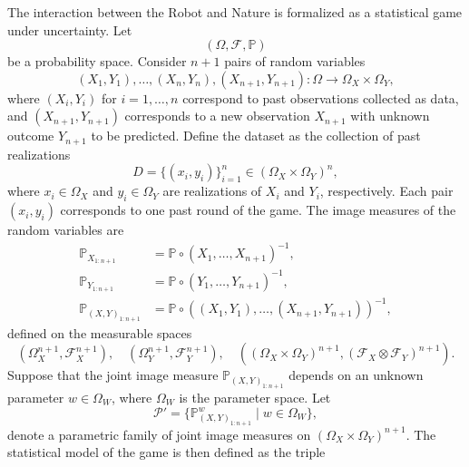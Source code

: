 \begin{definition}
	\label{def:statistical_game}
	The interaction between the Robot and Nature is formalized as a statistical game under uncertainty. Let
	\begin{equation}
		(\Omega, \mathcal{F}, \mathbb{P})
	\end{equation}
	be a probability space. Consider $n+1$ pairs of random variables
	\begin{equation}
		(X_1, Y_1), \dots, (X_n, Y_n), (X_{n+1}, Y_{n+1}) \colon \Omega \to \Omega_X \times \Omega_Y,
	\end{equation}
	where $(X_i,Y_i)$ for $i=1,\dots,n$ correspond to past observations collected as data, and $(X_{n+1},Y_{n+1})$ corresponds to a new observation $X_{n+1}$ with unknown outcome $Y_{n+1}$ to be predicted. Define the dataset as the collection of past realizations
	\begin{equation}
		D = \{(x_i, y_i)\}_{i=1}^n \in (\Omega_X \times \Omega_Y)^n,
	\end{equation}
	where $x_i \in \Omega_X$ and $y_i \in \Omega_Y$ are realizations of $X_i$ and $Y_i$, respectively. Each pair $(x_i, y_i)$ corresponds to one past round of the game. The image measures of the random variables are
	\begin{equation}
		\begin{split}
			\mathbb{P}_{X_{1:n+1}} &= \mathbb{P} \circ (X_1,\dots,X_{n+1})^{-1},\\
			\mathbb{P}_{Y_{1:n+1}} &= \mathbb{P} \circ (Y_1,\dots,Y_{n+1})^{-1},\\
			\mathbb{P}_{(X,Y)_{1:n+1}} &= \mathbb{P} \circ ((X_1,Y_1),\dots,(X_{n+1},Y_{n+1}))^{-1},
		\end{split}
	\end{equation}
	defined on the measurable spaces
	\begin{equation}
		(\Omega_X^{n+1},\mathcal{F}_X^{n+1}), \quad(\Omega_Y^{n+1},\mathcal{F}_Y^{n+1}), \quad ((\Omega_X \times \Omega_Y)^{n+1}, (\mathcal{F}_X \otimes \mathcal{F}_Y)^{n+1}).
	\end{equation}
	Suppose that the joint image measure $\mathbb{P}_{(X,Y)_{1:n+1}}$ depends on an unknown parameter $w \in \Omega_W$, where $\Omega_W$ is the parameter space. Let
	\begin{equation}
		\mathcal{P}' = \{ \mathbb{P}^w_{(X,Y)_{1:n+1}} \mid w \in \Omega_W \},
	\end{equation}
	denote a parametric family of joint image measures on $(\Omega_X \times \Omega_Y)^{n+1}$. The statistical model of the game is then defined as the triple

\end{definition}
